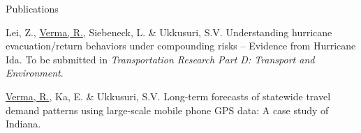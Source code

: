 \documentclass{CV} %
\begin{document}
\begin{rSection}{Publications}
\begin{etaremune}
        \item Lei, Z., \underline{Verma, R.}, Siebeneck, L. \& Ukkusuri, S.V. Understanding hurricane evacuation/return behaviors under compounding risks – Evidence from Hurricane Ida. To be submitted in \textit{Transportation Research Part D: Transport and Environment}.
        
        \item \underline{Verma, R.}, Ka, E. \& Ukkusuri, S.V. Long-term forecasts of statewide travel demand patterns using large-scale mobile phone GPS data: A case study of Indiana.
    \end{etaremune}
\end{rSection}

\end{document}
